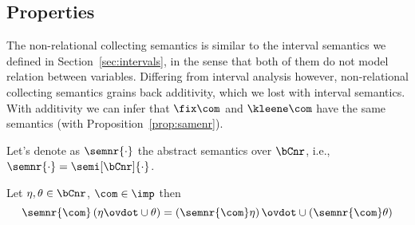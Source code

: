 \subsection{Properties}\label{sub:nonrelprop}

The non-relational collecting semantics is similar to the interval
semantics we defined in Section~\ref{sec:intervals}, in the sense that
both of them do not model relation between variables. Differing from
interval analysis however, non-relational collecting semantics grains
back additivity, which we lost with interval semantics. With
additivity we can infer that \(\fix\com\) and \(\kleene\com\) have the
same semantics (with Proposition~\ref{prop:samenr}).

\medskip

\noindent
Let's denote as \(\semnr{\cdot}\) the abstract semantics over
\(\bCnr\), i.e., \(\semnr{\cdot} = \semi[\bCnr]{\cdot}\).

\begin{lemma}[Additivity]
  Let \(\eta, \theta \in \bCnr\), \(\com\in\imp\) then
  \begin{equation*}
    \semnr{\com}\left(\eta \ovdot\cup \theta\right) = \left(\semnr{\com}\eta\right) \ovdot\cup \left(\semnr{\com}\theta\right)
  \end{equation*}
\end{lemma}

